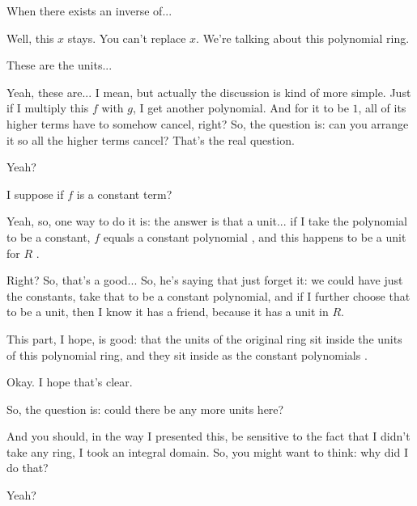 \begin{student}
When there exists an inverse of...
\end{student}

\begin{speech}[00:18:27 - 00:18:31]
Well, this $x$ stays. You can't replace $x$. We're talking about this polynomial ring.
\end{speech}

\begin{student}
These are the units...
\end{student}

\begin{speech}[00:18:33 - 00:18:56]
Yeah, these are... I mean, but actually the discussion is kind of more simple. Just if I multiply this $f$ with $g$, I get another polynomial. And for it to be $1$, all of its higher terms have to somehow cancel, right? So, the question is: can you arrange it so all the higher terms cancel? That's the real question.

Yeah?
\end{speech}

\begin{student}
I suppose if $f$ is a constant term?
\end{student}

\begin{speech}[00:18:59 - 00:20:09]
Yeah, so, one way to do it is: the answer is that a unit... if I take the polynomial to be a constant, $f$ equals a constant polynomial , and this happens to be a unit for $R$ .

Right? So, that's a good... So, he's saying that just forget it: we could have just the constants, take that to be a constant polynomial, and if I further choose that to be a unit, then I know it has a friend, because it has a unit in $R$.

This part, I hope, is good: that the units of the original ring sit inside the units of this polynomial ring, and they sit inside as the constant polynomials .

Okay. I hope that's clear.

So, the question is: could there be any more units here?

And you should, in the way I presented this, be sensitive to the fact that I didn't take any ring, I took an integral domain. So, you might want to think: why did I do that?

Yeah?
\end{speech}

